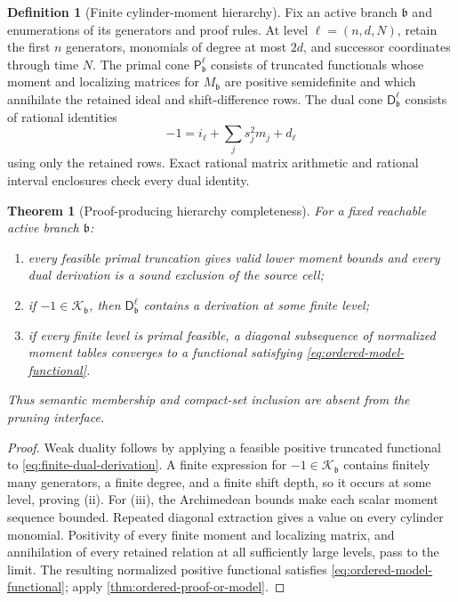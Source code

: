 \documentclass[11pt]{article}
\numberwithin{section}{part}
\theoremstyle{plain}
\newtheorem{theorem}{Theorem}[section]
\theoremstyle{definition}
\newtheorem{definition}[definition]{Definition}
\theoremstyle{remark}
\begin{document}
\begin{definition}[Finite cylinder-moment hierarchy]
\label{def:finite-cylinder-moment-hierarchy}
Fix an active branch \(\mathfrak b\) and enumerations of its generators and
proof rules.  At level \(\ell=(n,d,N)\), retain the first \(n\) generators, monomials of degree at
most \(2d\), and successor coordinates through time \(N\).  The primal cone
\(\mathsf P_{\mathfrak b}^{\ell}\) consists of truncated functionals whose moment
and localizing matrices for \(M_{\mathfrak b}\) are positive semidefinite and which
annihilate the retained ideal and shift-difference rows.  The dual cone
\(\mathsf D_{\mathfrak b}^{\ell}\) consists of rational identities
\begin{equation}
 \label{eq:finite-dual-derivation}
 -1=i_\ell+\sum_j s_j^2m_j+d_\ell
\end{equation}
using only the retained rows.  Exact rational matrix arithmetic and rational
interval enclosures check every dual identity.
\end{definition}

\begin{theorem}[Proof-producing hierarchy completeness]
\label{thm:proof-producing-hierarchy-completeness}
For a fixed reachable active branch \(\mathfrak b\):
\begin{enumerate}[label=\textup{(\roman*)}]
\item every feasible primal truncation gives valid lower moment bounds and
every dual derivation is a sound exclusion of the source cell;
\item if \(-1\in\mathcal K_{\mathfrak b}\), then
\(\mathsf D_{\mathfrak b}^{\ell}\) contains a derivation at some finite level;
\item if every finite level is primal feasible, a diagonal subsequence of
normalized moment tables converges to a functional satisfying
\eqref{eq:ordered-model-functional}.
\end{enumerate}
Thus semantic membership and compact-set inclusion are absent from the
pruning interface.
\end{theorem}

\begin{proof}
Weak duality follows by applying a feasible positive truncated functional to
\eqref{eq:finite-dual-derivation}.  A finite expression for
\(-1\in\mathcal K_{\mathfrak b}\) contains finitely many generators, a finite
degree, and a finite shift depth, so it occurs at some level, proving
\textup{(ii)}.  For \textup{(iii)}, the Archimedean bounds make each scalar
moment sequence bounded.  Repeated diagonal extraction gives a value on every
cylinder monomial.  Positivity of every finite moment and localizing matrix,
and annihilation of every retained relation at all sufficiently large levels,
pass to the limit.  The resulting normalized positive functional satisfies
\eqref{eq:ordered-model-functional}; apply
\cref{thm:ordered-proof-or-model}.
\end{proof}
\end{document}
